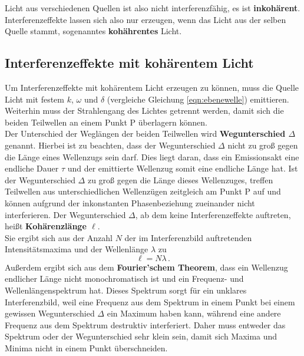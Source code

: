 Licht aus verschiedenen Quellen ist also nicht interferenzfähig, es ist \textbf{inkohärent}.
Interferenzeffekte lassen sich also nur erzeugen, wenn das Licht aus der selben Quelle stammt,
sogenanntes \textbf{kohährentes} Licht.


\subsection{Interferenzeffekte mit kohärentem Licht}
\label{sec:kohärenz}

Um Interferenzeffekte mit kohärentem Licht erzeugen zu können, muss die Quelle Licht mit
festem $k$, $\omega$ und $\delta$ (vergleiche Gleichung \eqref{eqn:ebenewelle}) emittieren.\\
Weiterhin muss der Strahlengang des Lichtes getrennt werden, damit sich die beiden Teilwellen
an einem Punkt P überlagern können.\\
Der Unterschied der Weglängen der beiden Teilwellen wird \textbf{Wegunterschied $\Delta$}
genannt.
Hierbei ist zu beachten, dass der Wegunterschied $\Delta$ nicht zu groß gegen die Länge eines
Wellenzugs sein darf. Dies liegt daran, dass ein Emissionsakt eine endliche Dauer $\tau$ und der
emittierte Wellenzug somit eine endliche Länge hat. Ist der Wegunterschied $\Delta$ zu groß
gegen die Länge dieses Wellenzuges, treffen Teilwellen aus unterschiedlichen Wellenzügen
zeitgleich am Punkt P auf und können aufgrund der inkonstanten Phasenbeziehung zueinander nicht
interferieren.
Der Wegunterschied $\Delta$, ab dem keine Interferenzeffekte auftreten, heißt \textbf{Kohärenzlänge $\ell$}.\\ Sie ergibt sich aus der Anzahl $N$ der im Interferenzbild
auftretenden Intensitätsmaxima und der Wellenlänge $\lambda$ zu
\begin{equation}
	\ell = N \lambda \, \mathrm{.}
\end{equation}
Außerdem ergibt sich aus dem \textbf{Fourier'schem Theorem}, dass ein Wellenzug endlicher
Länge nicht monochromatisch ist und ein Frequenz- und Wellenlängenspektrum hat. Dieses
Spektrum sorgt für ein unklares Interferenzbild, weil eine Frequenz aus dem Spektrum in einem
Punkt bei einem gewissen Wegunterschied $\Delta$ ein Maximum haben kann, während eine andere
Frequenz aus dem Spektrum destruktiv interferiert. Daher muss entweder das Spektrum oder der
Wegunterschied sehr klein sein, damit sich Maxima und Minima nicht in einem Punkt überschneiden.

